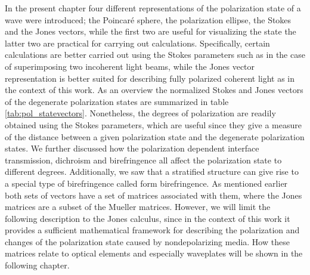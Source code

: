 In the present chapter four different representations of the polarization state of a wave were introduced; the Poincaré sphere, the polarization ellipse, the Stokes and the Jones vectors, while the first two are useful for visualizing the state the latter two are practical for carrying out calculations. Specifically, certain calculations are better carried out using the Stokes parameters such as in the case of superimposing two incoherent light beams, while the Jones vector representation is better suited for describing fully polarized coherent light as in the context of this work. As an overview the normalized Stokes and Jones vectors of the degenerate polarization states are summarized in table \ref{tab:pol_statevectors}. Nonetheless, the degrees of polarization are readily obtained using the Stokes parameters, which are useful since they give a measure of the distance between a given polarization state and the degenerate polarization states. We further discussed how the polarization dependent interface transmission, dichroism and birefringence all affect the polarization state to different degrees. Additionally, we saw that a stratified structure can give rise to a special type of birefringence called form birefringence. As mentioned earlier both sets of vectors have a set of matrices associated with them, where the Jones matrices are a subset of the Mueller matrices. However, we will limit the following description to the Jones calculus, since in the context of this work it provides a sufficient mathematical framework for describing the polarization and changes of the polarization state caused by nondepolarizing media. How these matrices relate to optical elements and especially waveplates will be shown in the following chapter.


